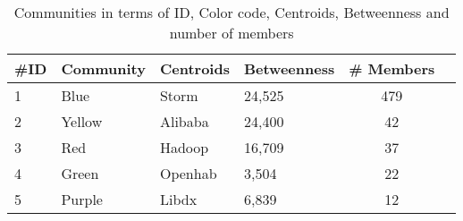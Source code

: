 
\begin{table*}[]
\centering
\caption{Communities in terms of ID, Color code, Centroids, Betweenness and number of members}
\label{tab:communities}
\begin{tabular}{llllcc}
\hline
\#ID               & Community             & Centroids        & Betweenness & \# Members        \\ \hline
1                  & Blue                  & Storm &           24,525 &    479                                      \\ \hline
2                  & Yellow                & Alibaba          & 24,400      & 42                                      \\ \hline
3                  & Red                   & Hadoop           & 16,709      & 37                                      \\ \hline
4                  & Green                 & Openhab          & 3,504       & 22                                      \\ \hline
5                  & Purple                & Libdx              & 6,839       & 12  \\ \hline                                
\end{tabular}
\end{table*}
